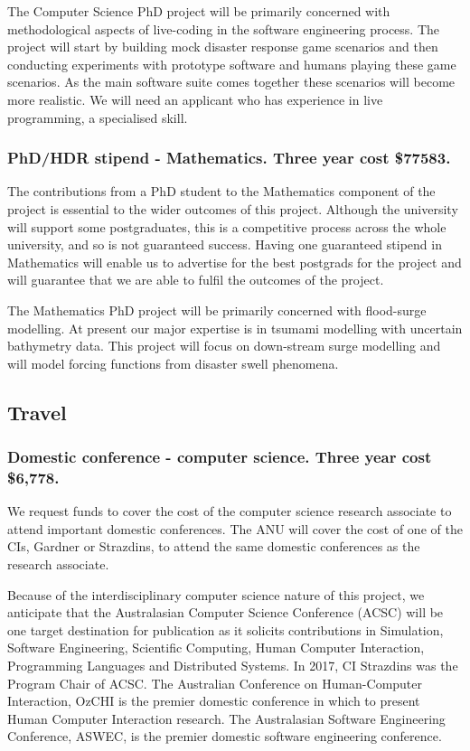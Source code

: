 \documentclass[a4paper,fontsize=12pt]{scrartcl}
\begin{document}
The Computer Science PhD project will be primarily concerned with methodological aspects of live-coding in the software engineering process. The project will start by building mock disaster response game scenarios and then conducting experiments with prototype software and humans playing these game scenarios. As the main software suite comes together these scenarios will become more realistic. We will need an applicant who has experience in live programming, a specialised skill. 

\subsubsection*{PhD/HDR stipend - Mathematics. Three year cost \$77583.}

The contributions from a PhD student to the Mathematics component of the project is essential to the wider outcomes of this project.
Although the university will support some postgraduates, this is a competitive
process across the whole university, and so is not guaranteed success. Having one guaranteed stipend in Mathematics will enable us to advertise for the best postgrads for the project and will guarantee that we are able to fulfil the outcomes of the project. 

The Mathematics PhD project will be primarily concerned with flood-surge modelling. At present our major expertise is in tsumami modelling with uncertain bathymetry data. This project will focus on down-stream surge modelling and will model forcing functions from disaster swell phenomena. 

\subsection*{Travel}

\subsubsection*{Domestic conference - computer science. Three year cost \$6,778.}

We request funds to cover the cost of the computer science research associate to attend important domestic conferences.  The ANU will cover the cost of one of the CIs, Gardner or Strazdins, to attend the same domestic conferences as the research associate. 

Because of the interdisciplinary computer science nature of this project, we anticipate that the Australasian Computer Science Conference (ACSC) will be one target destination for publication as it solicits contributions in Simulation, Software Engineering, Scientific Computing, Human Computer Interaction, Programming Languages and Distributed Systems. In 2017, CI Strazdins was the Program Chair of ACSC. 
The Australian Conference on Human-Computer Interaction, OzCHI is the premier domestic conference in which to present Human Computer Interaction research. The Australasian Software Engineering Conference, ASWEC, is the premier domestic software engineering conference. 
\end{document}
